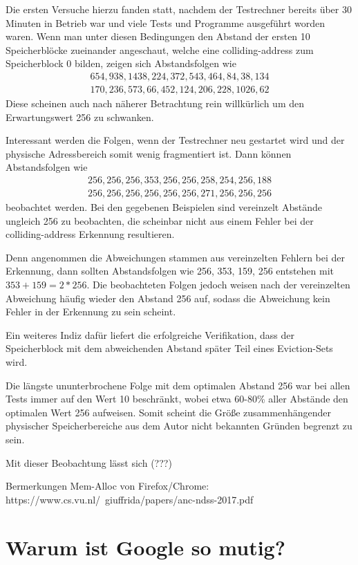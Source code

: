 Die ersten Versuche hierzu fanden statt, nachdem der Testrechner bereits über 30 Minuten in Betrieb war und viele Tests und Programme ausgeführt worden waren.
Wenn man unter diesen Bedingungen den Abstand der ersten 10 Speicherblöcke zueinander angeschaut, welche eine colliding-address zum Speicherblock 0 bilden, zeigen sich Abstandsfolgen wie 
\begin{align*} 
654, 938, 1438, 224, 372, 543, 464, 84, 38, 134\\
170, 236, 573, 66, 452, 124, 206, 228, 1026, 62
\end{align*}
Diese scheinen auch nach näherer Betrachtung rein willkürlich um den Erwartungswert 256 zu schwanken.

Interessant werden die Folgen, wenn der Testrechner neu gestartet wird und der physische Adressbereich somit wenig fragmentiert ist.
Dann können Abstandsfolgen wie 
\begin{align*} 
256, 256, 256, 353, 256, 256, 258, 254, 256, 188\\
256, 256, 256, 256, 256, 256, 271, 256, 256, 256
\end{align*}
beobachtet werden.
Bei den gegebenen Beispielen sind vereinzelt Abstände ungleich 256 zu beobachten, die scheinbar nicht aus einem Fehler bei der colliding-address Erkennung resultieren.

Denn angenommen die Abweichungen stammen aus vereinzelten Fehlern bei der Erkennung, dann sollten Abstandsfolgen wie 256, 353, 159, 256 entstehen mit $353+159=2*256$.
Die beobachteten Folgen jedoch weisen nach der vereinzelten Abweichung häufig wieder den Abstand 256 auf, sodass die Abweichung kein Fehler in der Erkennung zu sein scheint.

Ein weiteres Indiz dafür liefert die erfolgreiche Verifikation, dass der Speicherblock mit dem abweichenden Abstand später Teil eines Eviction-Sets wird.

Die längste ununterbrochene Folge mit dem optimalen Abstand 256 war bei allen Tests immer auf den Wert 10 beschränkt, wobei etwa 60-80\% aller Abstände den optimalen Wert 256 aufweisen.
Somit scheint die Größe zusammenhängender physischer Speicherbereiche aus dem Autor nicht bekannten Gründen begrenzt zu sein.

Mit dieser Beobachtung lässt sich (???)

Bermerkungen Mem-Alloc von Firefox/Chrome: https://www.cs.vu.nl/~giuffrida/papers/anc-ndss-2017.pdf
\cite{ASLROnTheLine}

\section{Warum ist Google so mutig?}
\label{GooglePageIsolation}


